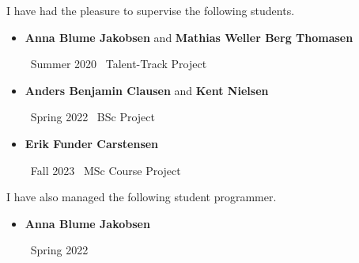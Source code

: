 
I have had the pleasure to supervise the following students.

\medskip

\begin{itemize}

\item {\color{accent} \textbf{Anna Blume Jakobsen} and \textbf{Mathias Weller Berg Thomasen}}

  \smallskip

  \faCalendar\ Summer 2020 \hspace{82pt} \faGraduationCap\ Talent-Track Project

%

  \medskip

\item {\color{accent} \textbf{Anders Benjamin Clausen} and \textbf{Kent Nielsen}}

  \smallskip

  \faCalendar\ Spring 2022 \hspace{90pt} \faGraduationCap\ BSc Project

%

  \medskip

\item {\color{accent} \textbf{Erik Funder Carstensen}}

  \smallskip

  \faCalendar\ Fall 2023 \hspace{101pt} \faGraduationCap\ MSc Course Project

%
\end{itemize}

\smallskip

I have also managed the following student programmer.

\medskip

\begin{itemize}
\item {\color{accent} \textbf{Anna Blume Jakobsen}}

  \smallskip

  \faCalendar \ Spring 2022
\end{itemize}
